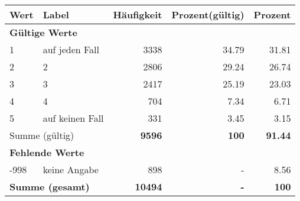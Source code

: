      \begin{longtable}{lXrrr}
     \toprule
     \textbf{Wert} & \textbf{Label} & \textbf{Häufigkeit} & \textbf{Prozent(gültig)} & \textbf{Prozent} \\
     \endhead
     \midrule
     \multicolumn{5}{l}{\textbf{Gültige Werte}}\\

     1 &
     \multicolumn{1}{X}{ auf jeden Fall   } &


       \num{3338} &
       \num[round-mode=places,round-precision=2]{34.79} &
         \num[round-mode=places,round-precision=2]{31.81} \\

     2 &
     \multicolumn{1}{X}{ 2   } &


       \num{2806} &
       \num[round-mode=places,round-precision=2]{29.24} &
         \num[round-mode=places,round-precision=2]{26.74} \\

     3 &
     \multicolumn{1}{X}{ 3   } &


       \num{2417} &
       \num[round-mode=places,round-precision=2]{25.19} &
         \num[round-mode=places,round-precision=2]{23.03} \\

     4 &
     \multicolumn{1}{X}{ 4   } &


       \num{704} &
       \num[round-mode=places,round-precision=2]{7.34} &
         \num[round-mode=places,round-precision=2]{6.71} \\

     5 &
     \multicolumn{1}{X}{ auf keinen Fall   } &


       \num{331} &
       \num[round-mode=places,round-precision=2]{3.45} &
         \num[round-mode=places,round-precision=2]{3.15} \\
     \midrule
     \multicolumn{2}{l}{Summe (gültig)} &
       \textbf{\num{9596}} &
     \textbf{\num{100}} &
       \textbf{\num[round-mode=places,round-precision=2]{91.44}} \\
     \multicolumn{5}{l}{\textbf{Fehlende Werte}}\\
       -998 &
       keine Angabe &
         \num{898} &
        - &
         \num[round-mode=places,round-precision=2]{8.56} \\
     \midrule
     \multicolumn{2}{l}{\textbf{Summe (gesamt)}} &
          \textbf{\num{10494}} &
        \textbf{-} &
        \textbf{\num{100}} \\
     \bottomrule
     \end{longtable}
     
